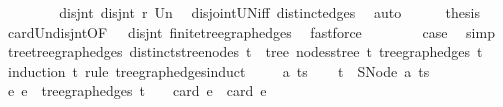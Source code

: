 \begin{isabellebody}
\ \ \isamarkupfalse%
{\isacharminus}{\kern0pt}\isanewline
\ \ \ \ \isamarkupfalse%
\ disjnt{\isacharcolon}{\kern0pt}\ {\isachardoublequoteopen}disjnt\ {\isacharquery}{\kern0pt}r\ {\isacharquery}{\kern0pt}Un{\isachardoublequoteclose}\ \isamarkupfalse%
\ disjoint{\isacharunderscore}{\kern0pt}UN{\isacharunderscore}{\kern0pt}iff\ distinct{\isacharunderscore}{\kern0pt}edges\ \isamarkupfalse%
\ auto\isanewline
\ \ \ \ \isamarkupfalse%
\ {\isacharquery}{\kern0pt}thesis\ \isamarkupfalse%
\ card{\isacharunderscore}{\kern0pt}Un{\isacharunderscore}{\kern0pt}disjnt{\isacharbrackleft}{\kern0pt}OF\ {\isacharunderscore}{\kern0pt}\ {\isacharunderscore}{\kern0pt}\ disjnt{\isacharbrackright}{\kern0pt}\ finite{\isacharunderscore}{\kern0pt}tree{\isacharunderscore}{\kern0pt}graph{\isacharunderscore}{\kern0pt}edges\ \isamarkupfalse%
\ fastforce\isanewline
\ \ \isamarkupfalse%
\isanewline
\ \ \isamarkupfalse%
\ \isamarkupfalse%
\ {\isacharquery}{\kern0pt}case\ \isamarkupfalse%
\ simp\isanewline
{}\isamarkupfalse%
%
\endisatagproof
{\isafoldproof}%
%
\isadelimproof
\isanewline
%
\endisadelimproof
\isanewline
{}\isamarkupfalse%
\ tree{\isacharunderscore}{\kern0pt}tree{\isacharunderscore}{\kern0pt}graph{\isacharunderscore}{\kern0pt}edges{\isacharcolon}{\kern0pt}\ {\isachardoublequoteopen}distinct{\isacharunderscore}{\kern0pt}stree{\isacharunderscore}{\kern0pt}nodes\ t\ {\isasymLongrightarrow}\ tree\ {\isacharparenleft}{\kern0pt}nodes{\isacharunderscore}{\kern0pt}stree\ t{\isacharparenright}{\kern0pt}\ {\isacharparenleft}{\kern0pt}tree{\isacharunderscore}{\kern0pt}graph{\isacharunderscore}{\kern0pt}edges\ t{\isacharparenright}{\kern0pt}{\isachardoublequoteclose}\isanewline
%
\isadelimproof
%
\endisadelimproof
%
\isatagproof
{}\isamarkupfalse%
\ {\isacharparenleft}{\kern0pt}induction\ t\ rule{\isacharcolon}{\kern0pt}\ tree{\isacharunderscore}{\kern0pt}graph{\isacharunderscore}{\kern0pt}edges{\isachardot}{\kern0pt}induct{\isacharparenright}{\kern0pt}\isanewline
\ \ \isamarkupfalse%
\ {\isacharparenleft}{\kern0pt}{}\ a\ ts{\isacharparenright}{\kern0pt}\isanewline
\ \ \isamarkupfalse%
\ {\isacharquery}{\kern0pt}t\ {\isacharequal}{\kern0pt}\ {\isachardoublequoteopen}SNode\ a\ ts{\isachardoublequoteclose}\isanewline
\ \ \isamarkupfalse%
\ {\isachardoublequoteopen}{\isasymAnd}e{\isachardot}{\kern0pt}\ e\ {\isasymin}\ tree{\isacharunderscore}{\kern0pt}graph{\isacharunderscore}{\kern0pt}edges\ {\isacharquery}{\kern0pt}t\ {\isasymLongrightarrow}\ {}\ {\isacharless}{\kern0pt}\ card\ e\ {\isasymand}\ card\ e\ {\isasymle}\ {}{\isachardoublequoteclose}\ \isamarkupfalse%

\end{isabellebody}
